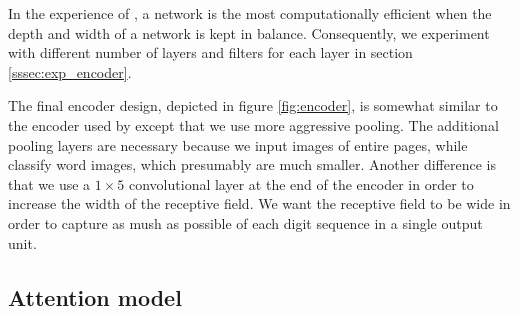 In the experience of \textcite{InceptionV3}, a network is the most computationally efficient when the depth and width of a network is kept in balance. Consequently, we experiment with different number of layers and filters for each layer in section \ref{sssec:exp_encoder}.




The final encoder design, depicted in figure \ref{fig:encoder}, is somewhat similar to the encoder used by \textcite{FornesCnnCategorization} except that we use more aggressive pooling. The additional pooling layers are necessary because we input images of entire pages, while \textcite{FornesCnnCategorization} classify word images, which presumably are much smaller.
Another difference is that we use a $1 \times 5$ convolutional layer at the end of the encoder in order to increase the width of the receptive field. We want the receptive field to be wide in order to capture as mush as possible of each  digit sequence in a single output unit.





\subsection{Attention model}

